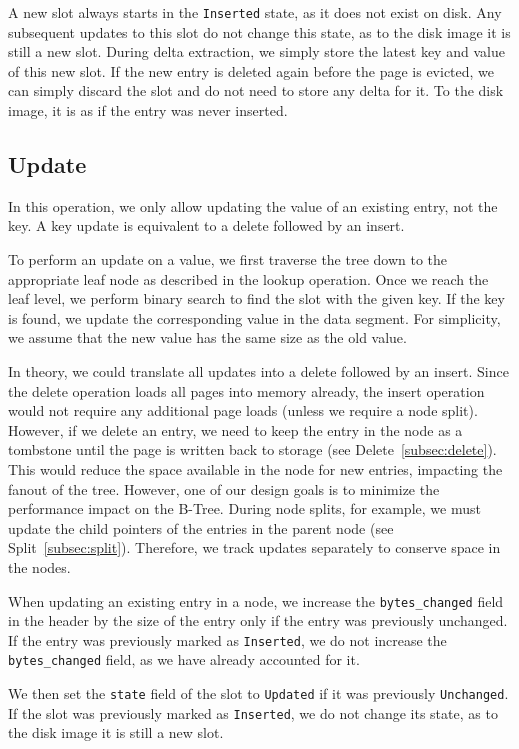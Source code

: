 A new slot always starts in the \texttt{Inserted} state, as it does not exist on disk.
Any subsequent updates to this slot do not change this state, as to the disk image it is still a new slot.
During delta extraction, we simply store the latest key and value of this new slot.
If the new entry is deleted again before the page is evicted, we can simply discard the slot and do not need to store any delta for it.
To the disk image, it is as if the entry was never inserted.

\subsection*{Update}
In this operation, we only allow updating the value of an existing entry, not the key.
A key update is equivalent to a delete followed by an insert.

To perform an update on a value, we first traverse the tree down to the appropriate leaf node as described in the lookup operation.
Once we reach the leaf level, we perform binary search to find the slot with the given key.
If the key is found, we update the corresponding value in the data segment.
For simplicity, we assume that the new value has the same size as the old value.

In theory, we could translate all updates into a delete followed by an insert.
Since the delete operation loads all pages into memory already, the insert operation would not require any additional page loads (unless we require a node split).
However, if we delete an entry, we need to keep the entry in the node as a tombstone until the page is written back to storage (see Delete~\ref{subsec:delete}).
This would reduce the space available in the node for new entries, impacting the fanout of the tree.
However, one of our design goals is to minimize the performance impact on the B-Tree.
During node splits, for example, we must update the child pointers of the entries in the parent node (see Split~\ref{subsec:split}).
Therefore, we track updates separately to conserve space in the nodes.

When updating an existing entry in a node, we increase the \texttt{bytes\_changed} field in the header by the size of the entry only if the entry was previously unchanged.
If the entry was previously marked as \texttt{Inserted}, we do not increase the \texttt{bytes\_changed} field, as we have already accounted for it.

We then set the \texttt{state} field of the slot to \texttt{Updated} if it was previously \texttt{Unchanged}.
If the slot was previously marked as \texttt{Inserted}, we do not change its state, as to the disk image it is still a new slot.

